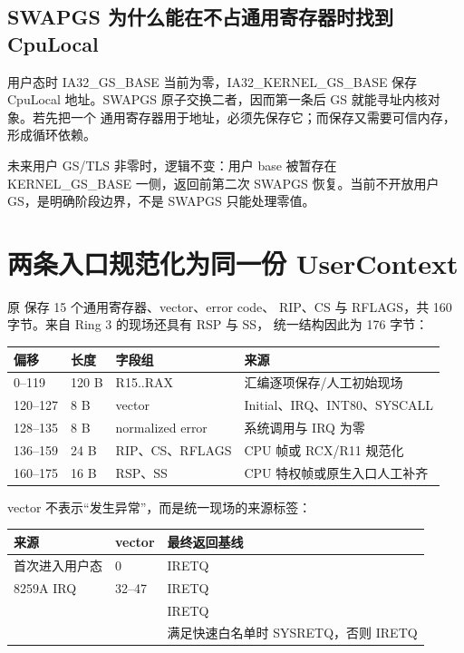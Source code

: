 \subsection{SWAPGS 为什么能在不占通用寄存器时找到 CpuLocal}

用户态时 IA32\_GS\_BASE 当前为零，IA32\_KERNEL\_GS\_BASE 保存 CpuLocal
地址。SWAPGS 原子交换二者，因而第一条后 GS 就能寻址内核对象。若先把一个
通用寄存器用于地址，必须先保存它；而保存又需要可信内存，形成循环依赖。

未来用户 GS/TLS 非零时，逻辑不变：用户 base 被暂存在 KERNEL\_GS\_BASE
一侧，返回前第二次 SWAPGS 恢复。当前不开放用户 GS，是明确阶段边界，不是
SWAPGS 只能处理零值。

\section{两条入口规范化为同一份 UserContext}

原  保存 15 个通用寄存器、vector、error code、
RIP、CS 与 RFLAGS，共 160 字节。来自 Ring 3 的现场还具有 RSP 与 SS，
统一结构因此为 176 字节：

\begin{longtable}{L{0.17\textwidth}L{0.17\textwidth}L{0.26\textwidth}L{0.28\textwidth}}
\toprule
偏移 & 长度 & 字段组 & 来源\\
--119 & 120 B & R15..RAX & 汇编逐项保存/人工初始现场\\
120--127 & 8 B & vector & Initial、IRQ、INT80、SYSCALL\\
128--135 & 8 B & normalized error & 系统调用与 IRQ 为零\\
136--159 & 24 B & RIP、CS、RFLAGS & CPU 帧或 RCX/R11 规范化\\
160--175 & 16 B & RSP、SS & CPU 特权帧或原生入口人工补齐\\
\bottomrule
\end{longtable}

vector 不表示“发生异常”，而是统一现场的来源标签：

\begin{longtable}{L{0.28\textwidth}L{0.20\textwidth}L{0.39\textwidth}}
\toprule
来源 & vector & 最终返回基线\\
\midrule
首次进入用户态 & 0 & IRETQ\\
8259A IRQ & 32--47 & IRETQ\\
 &  & IRETQ\\
 &  & 满足快速白名单时 SYSRETQ，否则 IRETQ\\
\bottomrule
\end{longtable}

